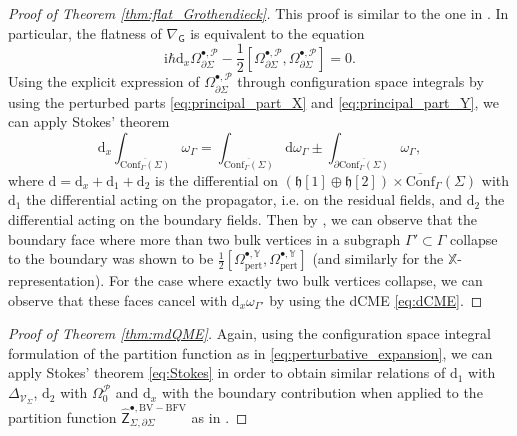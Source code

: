 \documentclass[11pt,colorinlistoftodos]{amsart}
\numberwithin{equation}{subsection}
\theoremstyle{plain}
\theoremstyle{definition}
\newtheorem{rem}[thm]{Remark}
\theoremstyle{remark}
\newcommand{\dd}{{\mathrm{d}}}
\newcommand{\de}{\partial}
\newcommand{\calP}{\mathcal{P}}
\newcommand{\I}{\mathrm{i}}
\newcommand{\calV}{\mathcal{V}}
\begin{document}
\begin{proof}[Proof of Theorem \ref{thm:flat_Grothendieck}]
This proof is similar to the one in \cite{CMW4}. In particular, the flatness of $\nabla_\mathsf{G}$ is equivalent to the equation
\begin{equation}
    \I\hbar\dd_x\Omega^{\bullet,\calP}_{\de\Sigma}-\frac{1}{2}\left[\Omega^{\bullet,\calP}_{\de\Sigma},\Omega^{\bullet,\calP}_{\de\Sigma}\right]=0.
\end{equation}
Using the explicit expression of $\Omega^{\bullet,\calP}_{\de\Sigma}$ through configuration space integrals by using the perturbed parts \eqref{eq:principal_part_X} and \eqref{eq:principal_part_Y}, we can apply Stokes' theorem 
\begin{equation}
\label{eq:Stokes}
\dd_x\int_{\overline{\mathrm{Conf}_\Gamma(\Sigma)}}\omega_\Gamma=\int_{\overline{\mathrm{Conf}_\Gamma(\Sigma)}}\dd\omega_\Gamma\pm \int_{\de\overline{\mathrm{Conf}_\Gamma(\Sigma)}}\omega_\Gamma,
\end{equation}
where $\dd=\dd_x+\dd_1+\dd_2$ is the differential on $(\mathfrak{h}[1]\oplus\mathfrak{h}[2])\times \overline{\mathrm{Conf}}_\Gamma(\Sigma)$ with $\dd_1$ the differential acting on the propagator, i.e. on the residual fields, and $\dd_2$ the differential acting on the boundary fields. Then by \cite[Lemma 4.9]{CMW4}, we can observe that the boundary face where more than two bulk vertices in a subgraph $\Gamma'\subset \Gamma$ collapse to the boundary was shown to be $\frac{1}{2}\left[\Omega^{\bullet,\mathds{Y}}_\mathrm{pert},\Omega^{\bullet,\mathds{Y}}_\mathrm{pert}\right]$ (and similarly for the $\mathds{X}$-representation). For the case where exactly two bulk vertices collapse, we can observe that these faces cancel with $\dd_x\omega_{\Gamma'}$ by using the dCME \eqref{eq:dCME}. 
\end{proof}


\begin{proof}[Proof of Theorem \ref{thm:mdQME}]
Again, using the configuration space integral formulation of the partition function as in \eqref{eq:perturbative_expansion}, we can apply Stokes' theorem \eqref{eq:Stokes} in order to obtain similar relations of $\dd_1$ with $\Delta_{\calV_\Sigma}$, $\dd_2$ with $\Omega_0^\calP$ and $\dd_x$ with the boundary contribution when applied to the partition function $\widehat{\mathsf{Z}}^{\bullet,\scriptscriptstyle\mathrm{BV-BFV}}_{\Sigma,\de\Sigma}$ as in \cite{CMW4}. 
\end{proof}
\end{document}
